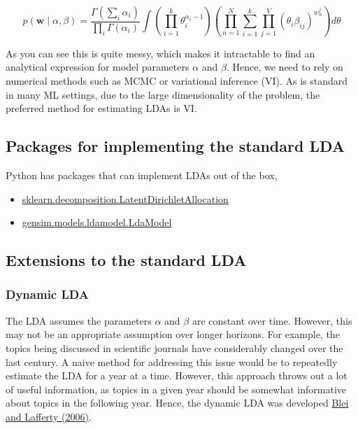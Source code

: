 \documentclass[
]{book}
\providecommand{\tightlist}{%
  \setlength{\itemsep}{0pt}\setlength{\parskip}{0pt}}
\begin{document}
\[p(\mathbf{w} \mid \alpha, \beta)=\frac{\Gamma\left(\sum_{i} \alpha_{i}\right)}{\prod_{i} \Gamma\left(\alpha_{i}\right)} \int\left(\prod_{i=1}^{k} \theta_{i}^{\alpha_{i}-1}\right)\left(\prod_{n=1}^{N} \sum_{i=1}^{k} \prod_{j=1}^{V}\left(\theta_{i} \beta_{i j}\right)^{w_{n}^{j}}\right) d \theta\]

As you can see this is quite messy, which makes it intractable to find an analytical expression for model parameters \(\alpha\) and \(\beta\). Hence, we need to rely on numerical methods such as MCMC or variational inference (VI). As is standard in many ML settings, due to the large dimensionality of the problem, the preferred method for estimating LDAs is VI.

\hypertarget{packages-for-implementing-the-standard-lda}{%
\subsection{Packages for implementing the standard LDA}\label{packages-for-implementing-the-standard-lda}}

Python has packages that can implement LDAs out of the box,

\begin{itemize}
\tightlist
\item
  \href{https://scikit-learn.org/stable/modules/generated/sklearn.decomposition.LatentDirichletAllocation.html}{sklearn.decomposition.LatentDirichletAllocation}
\item
  \href{https://radimrehurek.com/gensim/models/ldamodel.html}{gensim.models.ldamodel.LdaModel}
\end{itemize}

\hypertarget{extensions-to-the-standard-lda}{%
\subsection{Extensions to the standard LDA}\label{extensions-to-the-standard-lda}}

\hypertarget{dynamic-lda}{%
\subsubsection{Dynamic LDA}\label{dynamic-lda}}

The LDA assumes the parameters \(\alpha\) and \(\beta\) are constant over time. However, this may not be an appropriate assumption over longer horizons. For example, the topics being discussed in scientific journals have considerably changed over the last century. A naive method for addressing this issue would be to repeatedly estimate the LDA for a year at a time. However, this approach throws out a lot of useful information, as topics in a given year should be somewhat informative about topics in the following year. Hence, the dynamic LDA was developed \href{https://dl.acm.org/doi/10.1145/1143844.1143859}{Blei and Lafferty (2006)}.
\end{document}
